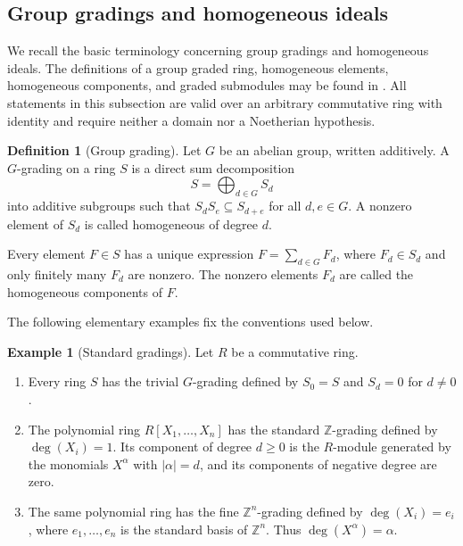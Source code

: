 \documentclass[preprint,12pt,3p]{elsarticle}
\theoremstyle{definition}
\newtheorem{definition}[theorem]{Definition}
\newtheorem{example}[theorem]{Example}
\theoremstyle{remark}
\begin{document}
	\subsection{Group gradings and homogeneous ideals}
	
	We recall the basic terminology concerning group gradings and
	homogeneous ideals. The definitions of a group graded ring,
	homogeneous elements, homogeneous components, and graded submodules
	may be found in
	\cite[Chapter~A, Section~I.1, pp.~1--3]
	{NastasescuVanOystaeyen1982}. All statements in this subsection are
	valid over an arbitrary commutative ring with identity and require
	neither a domain nor a Noetherian hypothesis.
	
	\begin{definition}[Group grading]
		\label{def:group-grading}
		Let $G$ be an abelian group, written additively. A $G$-grading on a
		ring $S$ is a direct sum decomposition
		\[
		S=\bigoplus_{d\in G}S_d
		\]
		into additive subgroups such that $S_dS_e\subseteq S_{d+e}$ for all
		$d,e\in G$. A nonzero element of $S_d$ is called homogeneous of
		degree $d$.
		
		Every element $F\in S$ has a unique expression
		$F=\sum_{d\in G}F_d$, where $F_d\in S_d$ and only finitely many
		$F_d$ are nonzero. The nonzero elements $F_d$ are called the
		homogeneous components of $F$.
	\end{definition}
	
	The following elementary examples fix the conventions used below.
	
	\begin{example}[Standard gradings]
		\label{ex:standard-gradings}
		Let $R$ be a commutative ring.
		\begin{enumerate}
			\item Every ring $S$ has the trivial $G$-grading defined by
			$S_0=S$ and $S_d=0$ for $d\neq 0$.
			
			\item The polynomial ring $R[X_1,\ldots,X_n]$ has the standard
			$\mathbb Z$-grading defined by $\deg(X_i)=1$. Its component of
			degree $d\geq 0$ is the $R$-module generated by the monomials
			$X^\alpha$ with $|\alpha|=d$, and its components of negative
			degree are zero.
			
			\item The same polynomial ring has the fine
			$\mathbb Z^n$-grading defined by $\deg(X_i)=e_i$, where
			$e_1,\ldots,e_n$ is the standard basis of $\mathbb Z^n$. Thus
			$\deg(X^\alpha)=\alpha$.
		\end{enumerate}
	\end{example}
	
\end{document}

